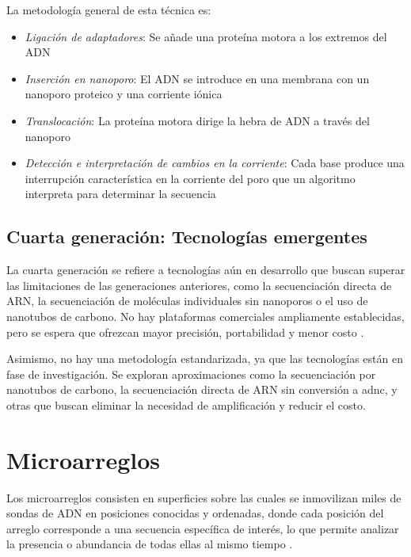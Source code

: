 \documentclass{AsignaturaResumen}
\begin{document}
La metodología general de esta técnica es:

\begin{itemize}
    \item \emph{Ligación de adaptadores}: Se añade una proteína motora a los extremos del ADN
    \item \emph{Inserción en nanoporo}: El ADN se introduce en una membrana con un nanoporo proteico y una corriente iónica
    \item \emph{Translocación}: La proteína motora dirige la hebra de ADN a través del nanoporo
    \item \emph{Detección e interpretación de cambios en la corriente}: Cada base produce una interrupción característica en la corriente del poro que un algoritmo interpreta para determinar la secuencia
\end{itemize}

    



\FloatBarrier
\subsection[Cuarta generación]{Cuarta generación: Tecnologías emergentes}

La cuarta generación se refiere a tecnologías aún en desarrollo que buscan superar las limitaciones de las generaciones anteriores, como la secuenciación directa de ARN, la secuenciación de moléculas individuales sin nanoporos o el uso de nanotubos de carbono. No hay plataformas comerciales ampliamente establecidas, pero se espera que ofrezcan mayor precisión, portabilidad y menor costo \citep{erenDNASequencingMethods2022}.

Asimismo, no hay una metodología estandarizada, ya que las tecnologías están en fase de investigación. Se exploran aproximaciones como la secuenciación por nanotubos de carbono, la secuenciación directa de ARN sin conversión a \acrshort{adnc}, y otras que buscan eliminar la necesidad de amplificación y reducir el costo.



\section{Microarreglos}

Los microarreglos consisten en superficies sobre las cuales se inmovilizan miles de sondas de ADN en posiciones conocidas y ordenadas, donde cada posición del arreglo corresponde a una secuencia específica de interés, lo que permite analizar la presencia o abundancia de todas ellas al mismo tiempo \citep{jaksikMicroarrayExperimentsFactors2015, govindarajanMicroarrayItsApplications2012}.
\end{document}
